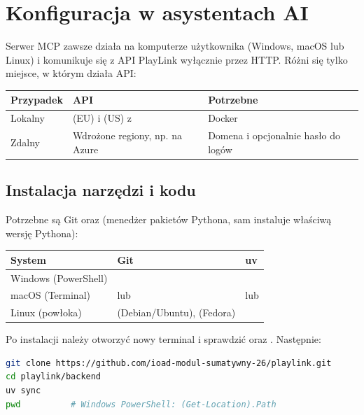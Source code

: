 \section{Konfiguracja w asystentach AI}
\label{sec:mcp-klienci}

Serwer MCP zawsze działa na komputerze użytkownika (Windows, macOS lub Linux) i komunikuje się
z API PlayLink wyłącznie przez HTTP. Różni się tylko miejsce, w którym działa API:

\begin{tabularx}{\textwidth}{llY}
\toprule
Przypadek & API & Potrzebne \\
\midrule
Lokalny &  (EU) i  (US) z  & Docker \\
Zdalny & Wdrożone regiony, np. na Azure & Domena i opcjonalnie hasło do logów \\
\bottomrule
\end{tabularx}

\subsection{Instalacja narzędzi i kodu}

Potrzebne są Git oraz  (menedżer pakietów Pythona, sam instaluje właściwą wersję Pythona):

\begin{tabularx}{\textwidth}{lYY}
\toprule
System & Git & uv \\
\midrule
Windows (PowerShell) &  &  \\
macOS (Terminal) &  lub  &  lub  \\
Linux (powłoka) &  (Debian/Ubuntu),  (Fedora) &  \\
\bottomrule
\end{tabularx}

Po instalacji należy otworzyć nowy terminal i sprawdzić  oraz .
Następnie:

\begin{lstlisting}[language=bash]
git clone https://github.com/ioad-modul-sumatywny-26/playlink.git
cd playlink/backend
uv sync
pwd          # Windows PowerShell: (Get-Location).Path
\end{lstlisting}

